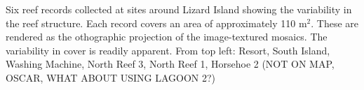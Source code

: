 \label{fig:six_samples} Six reef records collected at sites around Lizard Island showing the variability in the reef structure. Each record covers an area of approximately 110 m$^2$. These are rendered as the othographic projection of the image-textured mosaics. The variability in cover is readily apparent. From top left: Resort, South Island, Washing Machine, North Reef 3, North Reef 1,  Horsehoe 2 (NOT ON MAP, OSCAR, WHAT ABOUT USING LAGOON 2?)